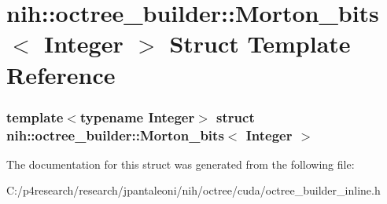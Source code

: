 \hypertarget{structnih_1_1octree__builder_1_1_morton__bits}{
\section{nih\-:\-:octree\-\_\-builder\-:\-:\-Morton\-\_\-bits$<$ \-Integer $>$ \-Struct \-Template \-Reference}
\label{structnih_1_1octree__builder_1_1_morton__bits}
}
\subsubsection*{template$<$typename Integer$>$ struct nih\-::octree\-\_\-builder\-::\-Morton\-\_\-bits$<$ Integer $>$}



\-The documentation for this struct was generated from the following file\-:\begin{DoxyCompactItemize}
\item 
\-C\-:/p4research/research/jpantaleoni/nih/octree/cuda/octree\-\_\-builder\-\_\-inline.\-h\end{DoxyCompactItemize}
